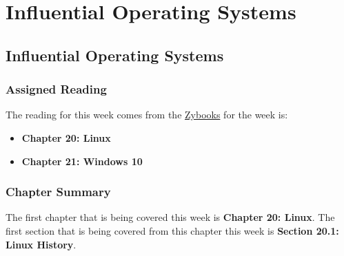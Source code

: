 \clearpage

\renewcommand{\ChapTitle}{Influential Operating Systems}
\renewcommand{\SectionTitle}{Influential Operating Systems}

\chapter{\ChapTitle}
\section{\SectionTitle}

\subsection{Assigned Reading}

The reading for this week comes from the \href{https://learn.zybooks.com/zybook/COLORADOCSPB3753KnoxFall2024}{Zybooks} for the week is:

\begin{itemize}
    \item \textbf{Chapter 20: Linux}
    \item \textbf{Chapter 21: Windows 10}
\end{itemize}

\newpage

\subsection{Chapter Summary}

The first chapter that is being covered this week is \textbf{Chapter 20: Linux}. The first section that is being covered from this chapter this week is \textbf{Section 20.1: Linux History}.

